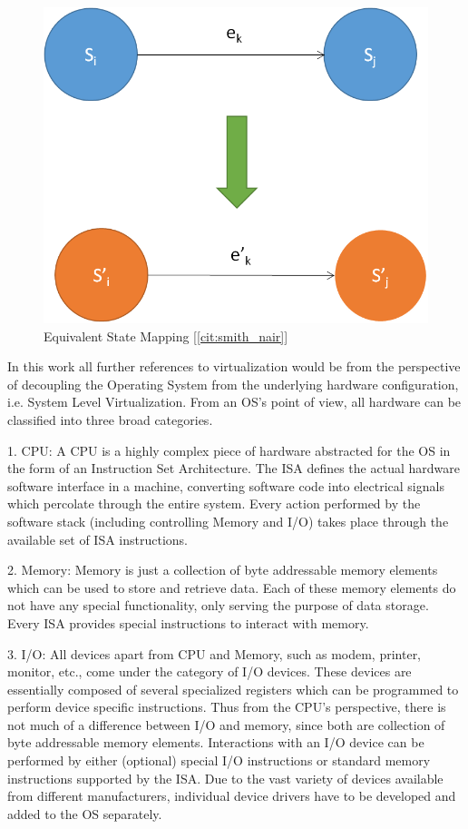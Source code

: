 \begin{figure}[H]
  \centering
  \includegraphics[scale=0.8]{figures/vir_phy_map.png}
  \caption{Equivalent State Mapping [\ref{cit:smith_nair}]}
  \label{fig:statemap}
\end{figure}

In this work all further references to virtualization would be from the perspective of decoupling the Operating System from the underlying hardware configuration, i.e. System Level Virtualization. From an OS's point of view, all hardware can be classified into three broad categories.

1. CPU: A CPU is a highly complex piece of hardware abstracted for the OS in the form of an Instruction Set Architecture. The ISA defines the actual hardware software interface in a machine, converting software code into electrical signals which percolate through the entire system. Every action performed by the software stack (including controlling Memory and I/O) takes place through the available set of ISA instructions.

2. Memory: Memory is just a collection of byte addressable memory elements which can be used to store and retrieve data. Each of these memory elements do not have any special functionality, only serving the purpose of data storage. Every ISA provides special instructions to interact with memory.

3. I/O: All devices apart from CPU and Memory, such as modem, printer, monitor, etc., come under the category of I/O devices. These devices are essentially composed of several specialized registers which can be programmed to perform device specific instructions. Thus from the CPU’s perspective, there is not much of a difference between I/O and memory, since both are collection of byte addressable memory elements. Interactions with an I/O device can be performed by either (optional) special I/O instructions or standard memory instructions supported by the ISA. Due to the vast variety of devices available from different manufacturers, individual device drivers have to be developed and added to the OS separately.

